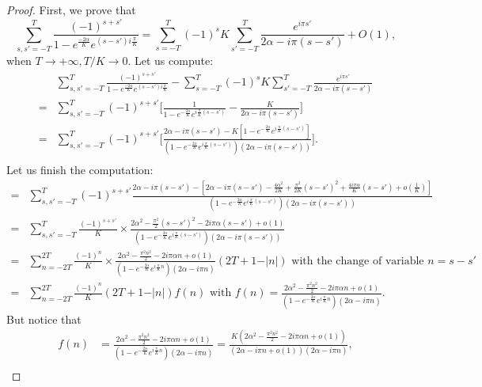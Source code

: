 \begin{proof}
First, we prove that 
\begin{equation}\label{approx O(1) loss}
    \sum_{s, s'=-T}^T\frac{(-1)^{s+s'}}{1 - e^{\frac{-2\alpha}{K}}e^{(s-s')i\frac{\pi}{K}}} = \sum_{s=-T}^T(-1)^sK\sum_{s'=-T}^T\frac{e^{i\pi s'}}{2\alpha - i\pi(s-s')} + O(1),
\end{equation}
when $T\rightarrow +\infty, T/K \rightarrow 0$. Let us compute:
\begin{align*}
        &\sum_{s, s'=-T}^T\frac{(-1)^{s+s'}}{1 - e^{\frac{-2\alpha}{K}}e^{(s-s')i\frac{\pi}{K}}} - \sum_{s=-T}^T(-1)^sK\sum_{s'=-T}^T\frac{e^{i\pi s'}}{2\alpha - i\pi(s-s')}\\
        =&\sum_{s, s'=-T}^T(-1)^{s+s'}\big[\frac{1}{1-e^{-\frac{2\alpha}{K}}e^{i\frac{\pi}{K}(s-s')}} - \frac{K}{2\alpha - i\pi(s-s')}\big]\\
        =&\sum_{s, s'=-T}^T(-1)^{s+s'}\big[\frac{2\alpha -i\pi(s-s')-K[1-e^{-\frac{2\alpha}{K}}e^{i\frac{\pi}{K}(s-s')}]}{(1-e^{-\frac{2\alpha}{K}}e^{i\frac{\pi}{K}(s-s')})(2\alpha - i\pi(s-s'))}\big].\\
\end{align*}
Let us finish the computation:
\begin{align*}
        =&\sum_{s, s'=-T}^T(-1)^{s+s'}\frac{2\alpha -i\pi(s-s')-[2\alpha - i\pi(s-s')-\frac{4\alpha^2}{2K}+\frac{\pi^2}{2K}(s-s')^2+\frac{4i\pi\alpha}{K}(s-s') +o(\frac{1}{K})]}{(1-e^{-\frac{2\alpha}{K}}e^{i\frac{\pi}{K}(s-s')})(2\alpha - i\pi(s-s'))}\\
        =&\sum_{s, s'=-T}^T\frac{(-1)^{s+s'}}{K}\times\frac{2\alpha^2 - \frac{\pi^2}{2}(s-s')^2 - 2i\pi\alpha(s-s')+o(1)}{(1-e^{-\frac{2\alpha}{K}}e^{i\frac{\pi}{K}(s-s')})(2\alpha - i\pi(s-s'))}\\
        =&\sum_{n=-2T}^{2T}\frac{(-1)^n}{K}\times\frac{2\alpha^2-\frac{\pi^2n^2}{2}-2i\pi\alpha n+o(1)}{(1-e^{-\frac{2\alpha}{K}}e^{i\frac{\pi}{K}n})(2\alpha - i\pi n)}(2T + 1-\vert n\vert) \text{ with the change of variable $n=s-s'$}\\
        =&\sum_{n=-2T}^{2T}\frac{(-1)^n}{K} (2T+1-\vert n\vert)f(n) \text{ with $f(n) = \frac{2\alpha^2-\frac{\pi^2n^2}{2}-2i\pi\alpha n+o(1)}{(1-e^{-\frac{2\alpha}{K}}e^{i\frac{\pi}{K}n})(2\alpha - i\pi n)}$}.
\end{align*}
But notice that \begin{align*}
    f(n) &= \frac{2\alpha^2-\frac{\pi^2n^2}{2}-2i\pi\alpha n+o(1)}{(1-e^{-\frac{2\alpha}{K}}e^{i\frac{\pi}{K}n})(2\alpha - i\pi n)} = \frac{K(2\alpha^2-\frac{\pi^2n^2}{2}-2i\pi\alpha n+o(1))}{(2\alpha - i\pi n +o(1))(2\alpha - i\pi n)},\\

\end{align*}
\end{proof}
